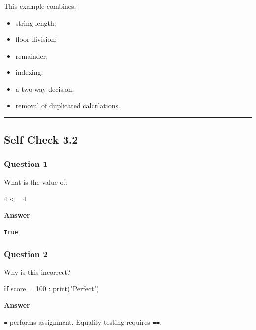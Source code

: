 \documentclass[
  11pt,
  a4paper,
]{article}
\newenvironment{Shaded}{}{}
\newcommand{\BuiltInTok}[1]{\textcolor[rgb]{0.00,0.50,0.00}{#1}}
\newcommand{\ControlFlowTok}[1]{\textcolor[rgb]{0.00,0.44,0.13}{\textbf{#1}}}
\newcommand{\DecValTok}[1]{\textcolor[rgb]{0.25,0.63,0.44}{#1}}
\newcommand{\NormalTok}[1]{#1}
\newcommand{\OperatorTok}[1]{\textcolor[rgb]{0.40,0.40,0.40}{#1}}
\newcommand{\StringTok}[1]{\textcolor[rgb]{0.25,0.44,0.63}{#1}}
\providecommand{\tightlist}{%
  \setlength{\itemsep}{0pt}\setlength{\parskip}{0pt}}
\begin{document}
This example combines:

\begin{itemize}
\tightlist
\item
  string length;
\item
  floor division;
\item
  remainder;
\item
  indexing;
\item
  a two-way decision;
\item
  removal of duplicated calculations.
\end{itemize}

\begin{center}\rule{0.5\linewidth}{0.5pt}\end{center}

\subsection{Self Check 3.2}\label{self-check-3.2}

\subsubsection{Question 1}\label{question-1-1}

What is the value of:

\begin{Shaded}
\begin{Highlighting}[]
\DecValTok{4} \OperatorTok{\textless{}=} \DecValTok{4}
\end{Highlighting}
\end{Shaded}

\textbf{Answer}

\texttt{True}.

\subsubsection{Question 2}\label{question-2-1}

Why is this incorrect?

\begin{Shaded}
\begin{Highlighting}[]
\ControlFlowTok{if}\NormalTok{ score }\OperatorTok{=} \DecValTok{100}\NormalTok{ :}
    \BuiltInTok{print}\NormalTok{(}\StringTok{"Perfect"}\NormalTok{)}
\end{Highlighting}
\end{Shaded}

\textbf{Answer}

\texttt{=} performs assignment. Equality testing requires \texttt{==}.
\end{document}
